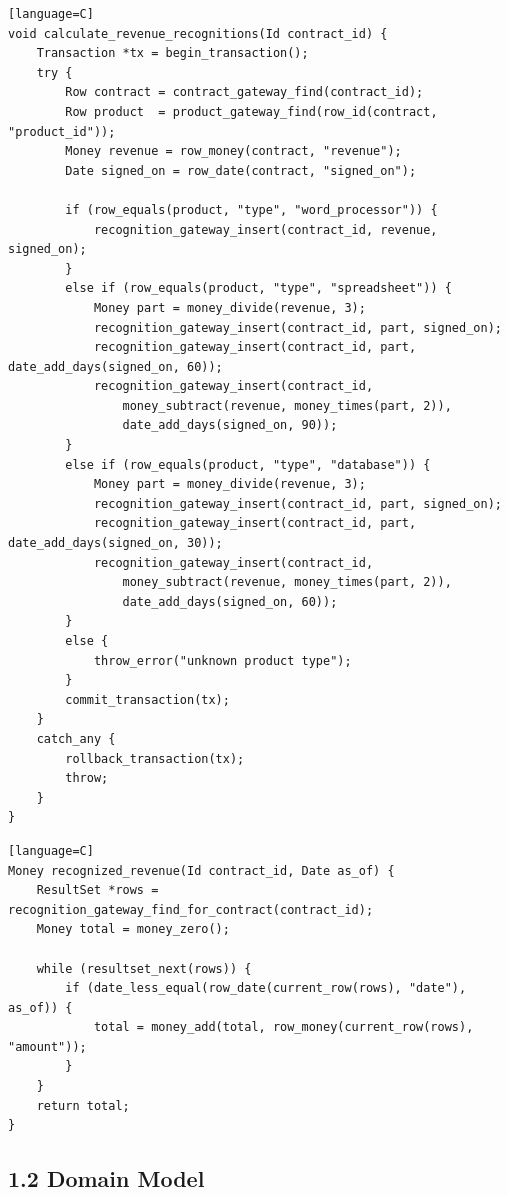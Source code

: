\documentclass[11pt]{article}
\begin{document}
\begin{verbatim}[language=C]
void calculate_revenue_recognitions(Id contract_id) {
    Transaction *tx = begin_transaction();
    try {
        Row contract = contract_gateway_find(contract_id);
        Row product  = product_gateway_find(row_id(contract, "product_id"));
        Money revenue = row_money(contract, "revenue");
        Date signed_on = row_date(contract, "signed_on");

        if (row_equals(product, "type", "word_processor")) {
            recognition_gateway_insert(contract_id, revenue, signed_on);
        }
        else if (row_equals(product, "type", "spreadsheet")) {
            Money part = money_divide(revenue, 3);
            recognition_gateway_insert(contract_id, part, signed_on);
            recognition_gateway_insert(contract_id, part, date_add_days(signed_on, 60));
            recognition_gateway_insert(contract_id,
                money_subtract(revenue, money_times(part, 2)),
                date_add_days(signed_on, 90));
        }
        else if (row_equals(product, "type", "database")) {
            Money part = money_divide(revenue, 3);
            recognition_gateway_insert(contract_id, part, signed_on);
            recognition_gateway_insert(contract_id, part, date_add_days(signed_on, 30));
            recognition_gateway_insert(contract_id,
                money_subtract(revenue, money_times(part, 2)),
                date_add_days(signed_on, 60));
        }
        else {
            throw_error("unknown product type");
        }
        commit_transaction(tx);
    }
    catch_any {
        rollback_transaction(tx);
        throw;
    }
}
\end{verbatim}

\begin{verbatim}[language=C]
Money recognized_revenue(Id contract_id, Date as_of) {
    ResultSet *rows = recognition_gateway_find_for_contract(contract_id);
    Money total = money_zero();

    while (resultset_next(rows)) {
        if (date_less_equal(row_date(current_row(rows), "date"), as_of)) {
            total = money_add(total, row_money(current_row(rows), "amount"));
        }
    }
    return total;
}
\end{verbatim}

\subsection{1.2 Domain Model}\label{domain-model}
\end{document}
